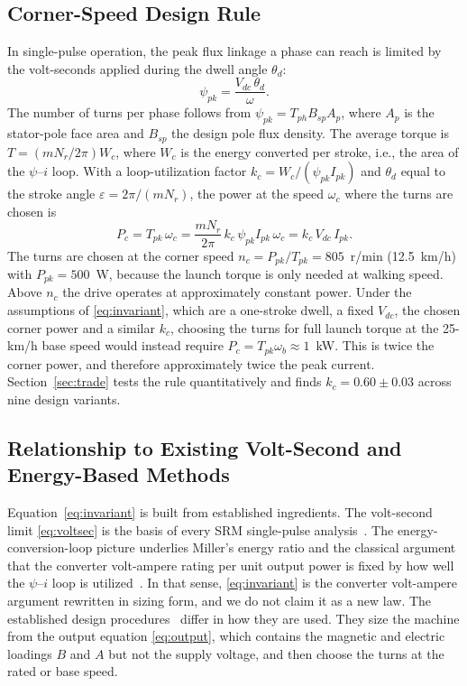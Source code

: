 \documentclass[journal]{IEEEtran}
\begin{document}
\subsection{Corner-Speed Design Rule}
\label{sec:corner}
In single-pulse operation, the peak flux linkage a phase can reach is limited by
the volt-seconds applied during the dwell angle $\theta_d$:
\begin{equation}
\psi_{pk} = \frac{V_{dc}\,\theta_d}{\omega}.
\label{eq:voltsec}
\end{equation}
The number of turns per phase follows from $\psi_{pk}=T_{ph}B_{sp}A_{p}$, where
$A_p$ is the stator-pole face area and $B_{sp}$ the design pole flux density.
The average torque is $T=(mN_r/2\pi)W_c$, where $W_c$ is the energy converted
per stroke, i.e., the area of the $\psi$--$i$ loop. With a loop-utilization
factor $k_c=W_c/(\psi_{pk}I_{pk})$ and $\theta_d$ equal to the stroke angle
$\varepsilon=2\pi/(mN_r)$, the power at the speed $\omega_c$ where the turns are
chosen is
\begin{equation}
P_c = T_{pk}\,\omega_c = \frac{mN_r}{2\pi}\,k_c\,\psi_{pk} I_{pk}\,\omega_c = k_c\,V_{dc}\,I_{pk}.
\label{eq:invariant}
\end{equation}
The turns are chosen at the corner speed $n_c=P_{pk}/T_{pk}=805$~r/min
(12.5~km/h) with $P_{pk}=500$~W, because the launch torque is only needed at
walking speed. Above $n_c$ the drive operates at approximately constant power.
Under the assumptions of \eqref{eq:invariant}, which are a one-stroke dwell, a
fixed $V_{dc}$, the chosen corner power and a similar $k_c$, choosing the turns
for full launch torque at the 25-km/h base speed would instead require
$P_c=T_{pk}\omega_b\approx1$~kW. This is twice the corner power, and therefore
approximately twice the peak current. Section~\ref{sec:trade} tests the rule
quantitatively and finds $k_c=0.60\pm0.03$ across nine design variants.

\subsection{Relationship to Existing Volt-Second and Energy-Based Methods}
\label{sec:novelty}
Equation~\eqref{eq:invariant} is built from established ingredients. The
volt-second limit \eqref{eq:voltsec} is the basis of every SRM single-pulse
analysis~\cite{miller1993,krishnan2001}. The energy-conversion-loop picture
underlies Miller's energy ratio and the classical argument that the converter
volt-ampere rating per unit output power is fixed by how well the
$\psi$--$i$ loop is utilized~\cite{miller1993}. In that sense,
\eqref{eq:invariant} is the converter volt-ampere argument rewritten in
sizing form, and we do not claim it as a new law. The established design
procedures~\cite{krishnan1988,radun1995,vijayakumar2008,bilgin2012} differ in
how they are used. They size the machine from the output equation
\eqref{eq:output}, which contains the magnetic and electric loadings $B$ and
$A$ but not the supply voltage, and then choose the turns at the rated or
base speed.
\end{document}
